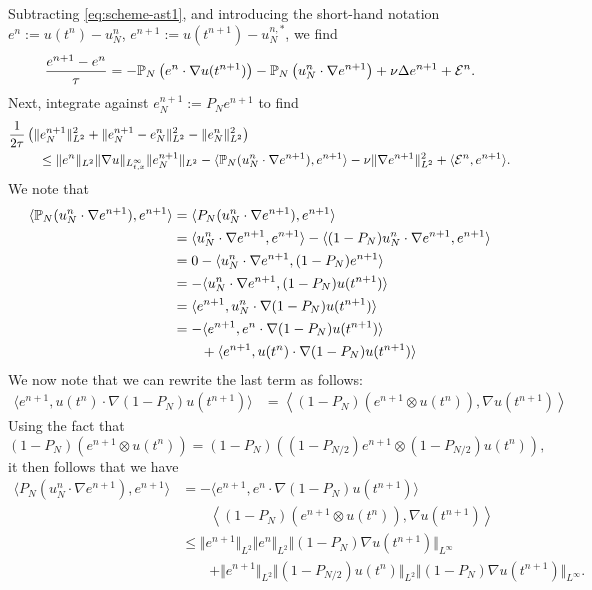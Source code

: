 \documentclass[reqno,a4paper]{amsart}
\begin{document}
Subtracting \eqref{eq:scheme-ast1}, and introducing the short-hand notation $e^n := u(t^n) - u_N^n$, $e^{n+1} := u(t^{n+1}) - u^{n,\ast}_N$, we find
\[
\frac{e^{n+1} - e^{n}}{{\tau}}
=
-\mathbb{P}_N\left(
e^n \cdot \nabla u(t^{n+1}) 
\right)
-
\mathbb{P}_N \left(
u^n_N \cdot \nabla e^{n+1}
\right)
+
\nu \Delta e^{n+1}
+
\mathcal{E}^n.
\]
Next, integrate against $e^{n+1}_N := P_N e^{n+1}$ to find
\begin{align*}
\frac1{2{\tau}}
&\left(
\Vert e_N^{n+1} \Vert_{L^2}^2 
+ 
\Vert e_N^{n+1} - e_N^n \Vert_{L^2}^2
- 
\Vert e_N^n \Vert_{L^2}^2
\right)
\\
&\quad \le
\Vert e^n \Vert_{L^2} \Vert \nabla u \Vert_{L^\infty_{t,x}} \Vert e_N^{n+1} \Vert_{L^2}
-
\langle \mathbb{P}_N(u^n_N \cdot \nabla e^{n+1}), e^{n+1} \rangle
-
\nu \Vert \nabla e^{n+1} \Vert_{L^2}^2 
+
\langle \mathcal{E}^n, e^{n+1} \rangle.
\end{align*}
We note that 
\begin{align}
\label{eq:11}
\begin{aligned} 
\langle \P_N(u^n_N \cdot \nabla e^{n+1}), e^{n+1} \rangle
&=
\langle P_N(u^n_N \cdot \nabla e^{n+1}), e^{n+1} \rangle
\\
&=
\langle u^n_N \cdot \nabla e^{n+1}, e^{n+1} \rangle
-
\langle (1-P_N) u^n_N \cdot \nabla e^{n+1}, e^{n+1} \rangle
\\
&=
0 -
\langle u^n_N \cdot \nabla e^{n+1}, (1-P_N) e^{n+1} \rangle
\\
&=
-
\langle u^n_N \cdot \nabla e^{n+1}, (1-P_N) u(t^{n+1}) \rangle
\\
&=
\langle e^{n+1},  u^n_N \cdot \nabla (1-P_N) u(t^{n+1}) \rangle
\\
&=
-\langle e^{n+1},  e^n \cdot \nabla (1-P_N) u(t^{n+1}) \rangle
\\
&\qquad
+ \langle e^{n+1},  u(t^n) \cdot \nabla (1-P_N) u(t^{n+1}) \rangle
\end{aligned}
\end{align}
We now note that we can rewrite the last term as follows:
\begin{align*}
\langle e^{n+1},  u(t^n) \cdot \nabla (1-P_N) u(t^{n+1}) \rangle
&=
\left\langle
(1-P_N)\left(e^{n+1} \otimes  u(t^n)\right),
\nabla u(t^{n+1})
\right\rangle
\end{align*}
Using the fact that 
\[
(1-P_N)\left(e^{n+1} \otimes  u(t^n)\right)
=
(1-P_N)\left( (1-P_{N/2}) e^{n+1} \otimes  (1-P_{N/2}) u(t^n)\right),
\]
it then follows that we have
\begin{align*}
\langle P_N(u^n_N \cdot \nabla e^{n+1}), e^{n+1} \rangle
&= -\langle e^{n+1},  e^n \cdot \nabla (1-P_N) u(t^{n+1}) \rangle
\\
&\qquad
\left\langle
(1-P_N)\left(e^{n+1} \otimes  u(t^n)\right),
\nabla u(t^{n+1})
\right\rangle
\\
&\le
\Vert e^{n+1} \Vert_{L^2} \Vert e^n \Vert_{L^2} \Vert (1-P_N) \nabla u(t^{n+1}) \Vert_{L^\infty}
\\
&\qquad
+ \Vert e^{n+1} \Vert_{L^2} \Vert (1-P_{N/2}) u(t^n) \Vert_{L^2} \Vert (1-P_N)\nabla u(t^{n+1}) \Vert_{L^\infty}.
\end{align*}
\end{document}
